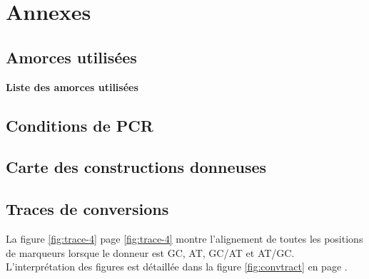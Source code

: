 \newpage
{}
\setcounter{page}{1}

\begin{multicols}{2}
\rmfamily
\tiny

\end{multicols}
\newpage


\setcounter{section}{0}
\section{Annexes}


\setcounter{subsection}{1}
\subsection{Amorces utilisées}
\label{subsec:annexe-amorces}


\caption[Liste des amorces utilisées]{\label{fig:amorces}\textbf{Liste des
    amorces utilisées}}

\subsection{Conditions de PCR}
\label{subsec:annexe-pcr}

\subsection{Carte des constructions donneuses}
\label{subsec:cartes-plasmides}



\subsection{Traces de conversions}
\label{subsec:trac-de-conv}

La figure \ref{fig:trace-4} page \ref{fig:trace-4} montre l'alignement de toutes
les positions de marqueurs lorsque le donneur est GC, AT, GC/AT et AT/GC.
L'interprétation des figures est détaillée dans la figure \ref{fig:convtract} en
page \pageref{fig:convtract}.

